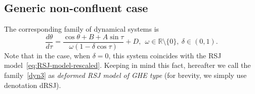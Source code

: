 \documentclass[preprint,12pt]{elsarticle}
\theoremstyle{plain}
\numberwithin{equation}{section}
\numberwithin{equation}{section}
\begin{document}
\subsection{Generic non-confluent case}\label{subsec:gen-non-confl}

The corresponding family of dynamical systems is 
\begin{equation}\label{dyn3}
    \frac{d\theta}{d\tau}=\frac{\cos\theta+B+A\sin\tau}{\omega(1-\delta\cos\tau)}+D, \ \  \omega\in\mathbb R\setminus\{0\}, \ \delta\in(0,1).
\end{equation}
Note that in the case, when $\delta=0$, this system coincides with the RSJ model~\eqref{eq:RSJ-model-rescaled}. Keeping in mind this fact, hereafter we call the family~\eqref{dyn3} as \emph{deformed RSJ model of GHE type} (for brevity, we simply use denotation dRSJ).
\end{document}
